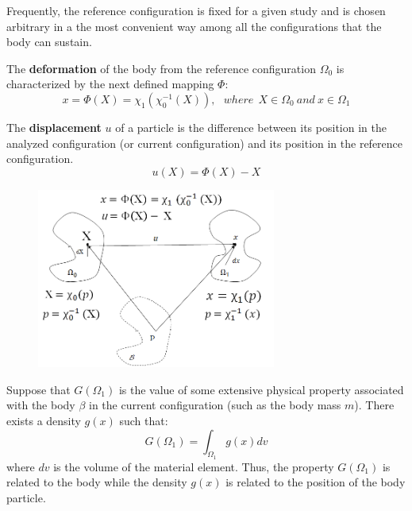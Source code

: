 Frequently, the reference configuration is fixed for a given study and is chosen arbitrary in a the most convenient way among all the configurations that the body can sustain. 
 
 The \textbf{deformation} of the body from the reference configuration $\Omega_0$ is characterized by the next defined mapping $\Phi$:
 \begin{equation} 
 x = \Phi(X) = \chi_1(\chi_0^{-1}(X)), \ \ \  where \ \  X \in \Omega_0 \ and \ x \in \Omega_1
 \label{referenceToCurrentCoordinates}
 \end{equation}
 
 The \textbf{displacement} $u$ of a particle is the difference between its position in the analyzed configuration (or current configuration) and its position in the reference configuration.
 \begin{equation}
 u(X) = \Phi(X) - X
 \end{equation}


\begin{figure}
\begin{center}
\includegraphics[width=0.7\textwidth,keepaspectratio]{figures/referenceFig.png} 
\caption[]{ }
\label{reference_config_theory}
\end{center}
\end{figure}

Suppose that $G(\Omega_1)$ is the value of some extensive physical property  associated with the body $\beta$ in the current configuration (such as the body mass $m$). There exists a density $g(x)$ such that:
 $$G(\Omega_1) = \int_{\Omega_1} g(x)dv$$  
 where $dv$ is the volume of the material element.
 Thus, the property $G(\Omega_1)$ is related to the body while the density $g(x)$ is related to the position of the body particle.
